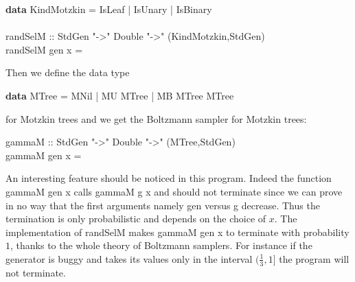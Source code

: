 \documentclass{sig-alternate}
\begin{document}
\begin{haskell}
  \hspace*{-20pt}\textbf{data} KindMotzkin = IsLeaf | IsUnary | IsBinary \\
  ~\\
  \hspace*{-20pt}randSelM :: StdGen "->"  Double "->" (KindMotzkin,StdGen)\\
  \hspace*{-20pt}randSelM gen x = 
\end{haskell}
Then we define the data type
\begin{haskell}
  \textbf{data} MTree = MNil | MU MTree | MB MTree MTree
\end{haskell}
for Motzkin trees and we get the Boltzmann sampler for Motzkin trees:
\begin{haskell}
  \hspace*{-20pt}gammaM :: StdGen "->" Double "->" (MTree,StdGen) \\
  \hspace*{-20pt}gammaM gen x = 
\end{haskell}
An interesting feature should be noticed in this program.  Indeed the function
\<gammaM gen x\> calls \<gammaM g x\> and should not terminate since we can prove in
no way that the first arguments namely \<gen\> versus \<g\> decrease. Thus the
termination is only probabilistic and depends on the choice of $x$.  The
implementation of \<randSelM\> makes \<gammaM gen x\> to terminate with
probability $1$, thanks to the whole theory of Boltzmann samplers. For instance if
the generator is buggy and takes its values only in the interval $(\frac{1}{3},1]$
the program will not terminate.
\end{document}
